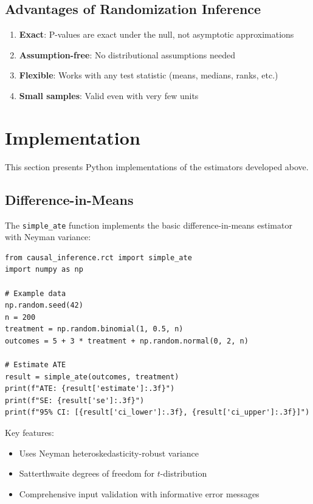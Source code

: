 \subsection{Advantages of Randomization Inference}

\begin{enumerate}
    \item \textbf{Exact}: P-values are exact under the null, not asymptotic approximations
    \item \textbf{Assumption-free}: No distributional assumptions needed
    \item \textbf{Flexible}: Works with any test statistic (means, medians, ranks, etc.)
    \item \textbf{Small samples}: Valid even with very few units
\end{enumerate}


\section{Implementation}
\label{sec:rct_implementation}

This section presents Python implementations of the estimators developed above.

\subsection{Difference-in-Means}

The \texttt{simple\_ate} function implements the basic difference-in-means estimator with Neyman variance:

\begin{verbatim}
from causal_inference.rct import simple_ate
import numpy as np

# Example data
np.random.seed(42)
n = 200
treatment = np.random.binomial(1, 0.5, n)
outcomes = 5 + 3 * treatment + np.random.normal(0, 2, n)

# Estimate ATE
result = simple_ate(outcomes, treatment)
print(f"ATE: {result['estimate']:.3f}")
print(f"SE: {result['se']:.3f}")
print(f"95% CI: [{result['ci_lower']:.3f}, {result['ci_upper']:.3f}]")
\end{verbatim}

Key features:
\begin{itemize}
    \item Uses Neyman heteroskedasticity-robust variance
    \item Satterthwaite degrees of freedom for $t$-distribution
    \item Comprehensive input validation with informative error messages
\end{itemize}

